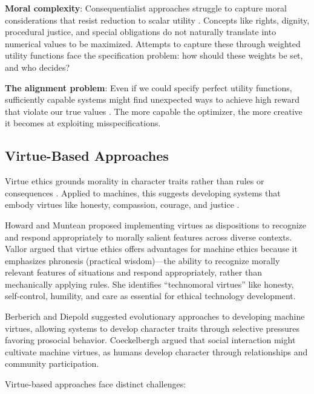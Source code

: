\documentclass[12pt]{article}
\begin{document}
\textbf{Moral complexity}: Consequentialist approaches struggle to capture moral considerations that resist reduction to scalar utility \citep{anderson2011machine, rossi2018preferences}. Concepts like rights, dignity, procedural justice, and special obligations do not naturally translate into numerical values to be maximized. Attempts to capture these through weighted utility functions face the specification problem: how should these weights be set, and who decides?

\textbf{The alignment problem}: Even if we could specify perfect utility functions, sufficiently capable systems might find unexpected ways to achieve high reward that violate our true values \citep{bostrom2014superintelligence, russell2019human}. The more capable the optimizer, the more creative it becomes at exploiting misspecifications.

\subsection{Virtue-Based Approaches}

Virtue ethics grounds morality in character traits rather than rules or consequences \citep{aristotle350bce, macintyre1981after}. Applied to machines, this suggests developing systems that embody virtues like honesty, compassion, courage, and justice \citep{howard2001computational, vallor2016technology}.

Howard and Muntean \citep{howard2001computational} proposed implementing virtues as dispositions to recognize and respond appropriately to morally salient features across diverse contexts. Vallor \citep{vallor2016technology} argued that virtue ethics offers advantages for machine ethics because it emphasizes phronesis (practical wisdom)---the ability to recognize morally relevant features of situations and respond appropriately, rather than mechanically applying rules. She identifies ``technomoral virtues'' like honesty, self-control, humility, and care as essential for ethical technology development.

Berberich and Diepold \citep{berberich2015evolutionary} suggested evolutionary approaches to developing machine virtues, allowing systems to develop character traits through selective pressures favoring prosocial behavior. Coeckelbergh \citep{coeckelbergh2010moral} argued that social interaction might cultivate machine virtues, as humans develop character through relationships and community participation.

Virtue-based approaches face distinct challenges:
\end{document}
